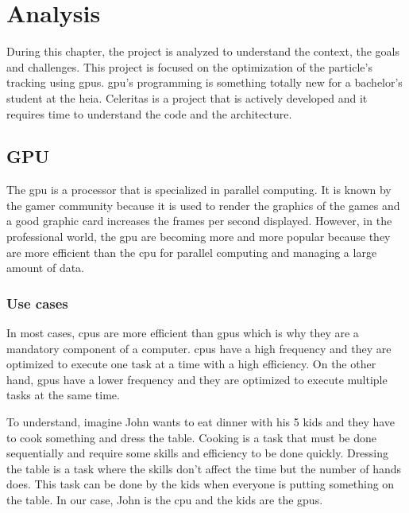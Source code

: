 \chapter{Analysis}
\label{ch:analyze}

During this chapter, the project is analyzed to understand the context, the
goals and challenges.
This project is focused on the optimization of the particle's tracking using
\acrshort{gpu}s.
\acrshort{gpu}'s programming is something totally new for a bachelor's
student at the \acrshort{heia}.
Celeritas is a project that is actively developed and it requires time to
understand the code and the architecture.


\section{GPU}
\label{ch:analyze:gpu}

The \acrfull{gpu} is a processor that is specialized in parallel computing.
It is known by the gamer community because it is used to render the graphics of
the games and a good graphic card increases the frames per second displayed.
However, in the professional world, the \acrshort{gpu} are becoming more and
more popular because they are more efficient than the \acrshort{cpu} for
parallel computing and managing a large amount of data.


\subsection{Use cases}
\label{ch:analyze:gpu:use-cases}

In most cases, \acrshort{cpu}s are more efficient than \acrshort{gpu}s
which is why they are a mandatory component of a computer.
\acrshort{cpu}s have a high frequency and they are optimized to execute one
task at a time with a high efficiency.
On the other hand, \acrshort{gpu}s have a lower frequency and they are optimized
to execute multiple tasks at the same time.

To understand, imagine John wants to eat dinner with his 5 kids and they have to
cook something and dress the table.
Cooking is a task that must be done sequentially and require some skills and
efficiency to be done quickly.
Dressing the table is a task where the skills don't affect the time but the
number of hands does.
This task can be done by the kids when everyone is putting something on the table.
In our case, John is the \acrshort{cpu} and the kids are the \acrshort{gpu}s.

